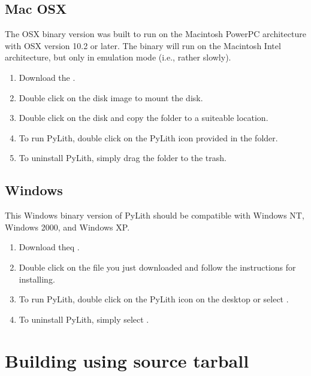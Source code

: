 \subsection{Mac OSX}

The OSX binary version was built to run on the Macintosh PowerPC
architecture with OSX version 10.2 or later. The binary will run on
the Macintosh Intel architecture, but only in emulation mode (i.e.,
rather slowly).

\begin{enumerate}
\item Download the .
\item Double click on the disk image to mount the disk.
\item Double click on the disk and copy the  folder
  to a suiteable location.
\item To run PyLith, double click on the PyLith icon provided in the  folder.
\item To uninstall PyLith, simply drag the  folder
  to the trash.
\end{enumerate}

\subsection{Windows}

This Windows binary version of PyLith should be compatible with
Windows NT, Windows 2000, and Windows XP.

\begin{enumerate}
\item Download theq
  .
\item Double click on the  file you just
  downloaded and follow the instructions for installing.
\item To run PyLith, double click on the PyLith icon on the desktop or
  select
  \guiselect{}\guiselect{}\guiselect{}.
\item To uninstall PyLith, simply select
  \guiselect{}\guiselect{}\guiselect{}.
\end{enumerate}

\section{Building using source tarball}

